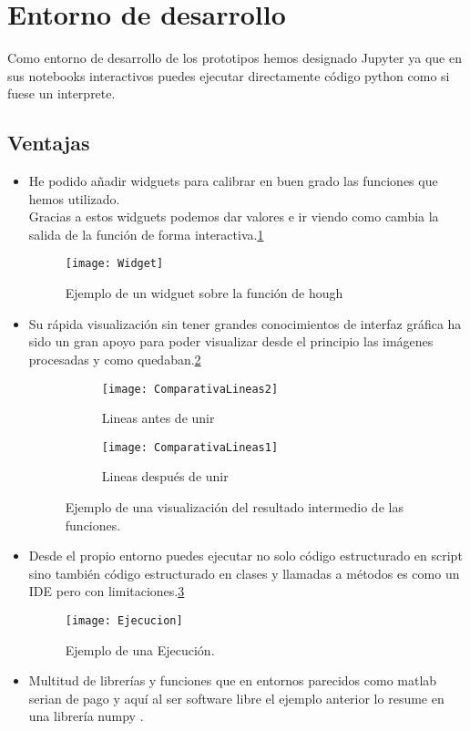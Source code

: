 
\section{Entorno de desarrollo}
Como entorno de desarrollo de los prototipos hemos designado Jupyter ya que en sus notebooks interactivos puedes ejecutar directamente código python como si fuese un interprete.

\subsection{Ventajas}
\begin{itemize}
\item He podido añadir widguets para calibrar en buen grado las funciones que hemos utilizado.\\
Gracias a estos widguets podemos dar valores e ir viendo como cambia la salida de la función de forma interactiva.\ref{fig:5.1}

\begin{figure}[h]
\centering
\texttt{[image: Widget]}
\caption{Ejemplo de un widguet sobre la función de hough}
\label{fig:5.1}
\end{figure}

\item Su rápida visualización sin tener grandes conocimientos de interfaz gráfica ha sido un gran apoyo para poder visualizar desde el principio las imágenes procesadas y como quedaban.\ref{fig:5.2} 

\begin{figure}
\begin{subfigure}[b]{.5\linewidth}
\centering\large \texttt{[image: ComparativaLineas2]}
\caption{Lineas antes de unir}
\end{subfigure}%
\begin{subfigure}[b]{.5\linewidth}
\centering\large \texttt{[image: ComparativaLineas1]}
\caption{Lineas después de unir}
\end{subfigure}
\caption{Ejemplo de una visualización del resultado intermedio de las funciones.}\label{fig:5.2}
\end{figure}


\item Desde el propio entorno puedes ejecutar no solo código estructurado en script sino también código estructurado en clases y llamadas a métodos es como un IDE pero con limitaciones.\ref{fig:5.3}

\begin{figure}[h]
\centering
\texttt{[image: Ejecucion]}
\caption{Ejemplo de una Ejecución.}
\label{fig:5.3}
\end{figure}

\item Multitud de librerías y funciones que en entornos parecidos como matlab serian de pago y aquí al ser software libre el ejemplo anterior lo resume en una librería numpy \cite{Numpy}.
\end{itemize}

